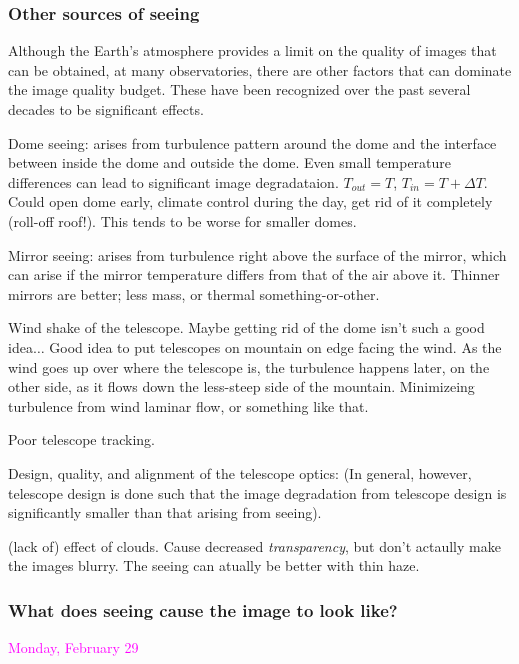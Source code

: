 \documentclass[12pt]{article}
\begin{document}
\subsubsection*{Other sources of seeing}
Although the Earth's atmosphere provides a limit on the quality of
images that can be obtained, at many observatories, there are other
factors that can dominate the image quality budget. These have been
recognized over the past several decades to be significant effects.
\begin{itemize*}
    \item Dome seeing: arises from turbulence pattern around the
    dome and the interface between inside the dome and outside the dome.
    Even small temperature differences can lead to significant
    image degradataion. \textcolor{myBlue}{$T_{out} = T$, $T_{in} = T
    + \Delta T$. Could open dome early, climate control during the
    day, get rid of it completely (roll-off roof!). This tends to be
    worse for smaller domes.}
    \item Mirror seeing: arises from turbulence right above the
    surface of the mirror, which can arise if the mirror temperature
    differs from that of the air above it. \textcolor{myBlue}{
    Thinner mirrors are better; less mass, or thermal
    something-or-other}.
    \item Wind shake of the telescope. \textcolor{myBlue}{
    Maybe getting rid of the dome isn't such a good idea$\ldots$
    Good idea to put telescopes on mountain on edge facing the wind.
    As the wind goes up over where the telescope is, the turbulence
    happens later, on the other side, as it flows down the less-steep
    side of the mountain. Minimizeing turbulence from wind laminar
    flow, or something like that.}
    \item Poor telescope tracking.
    \item Design, quality, and alignment of the telescope
    optics: (In general, however,
    telescope design is done such that the image degradation from
    telescope design is significantly smaller than that arising from
    seeing).
    \item (lack of) effect of clouds. \textcolor{myBlue}{Cause
    decreased \emph{transparency}, but don't actaully make the images
    blurry. The seeing can atually be better with thin haze.}
\end{itemize*}

\subsubsection*{What does seeing cause the image to look like?}
\textcolor{magenta}{Monday, February 29}
\end{document}
